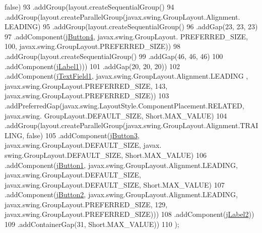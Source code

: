 \begin{DoxyCode}
{      false})
93                             .addGroup(layout.createSequentialGroup()
94                                 .addGroup(layout.createParallelGroup(javax.swing.GroupLayout.Alignment.
      LEADING)
95                                     .addGroup(layout.createSequentialGroup()
96                                         .addGap(23, 23, 23)
97                                         .addComponent(\mbox{\hyperlink{classpecl6part2_1_1_modulo_controlador_a0fd427b07850c91ef7c49d42321b6ec4}{jButton4}}, javax.swing.GroupLayout.
      PREFERRED\_SIZE, 100, javax.swing.GroupLayout.PREFERRED\_SIZE))
98                                     .addGroup(layout.createSequentialGroup()
99                                         .addGap(46, 46, 46)
100                                         .addComponent(\mbox{\hyperlink{classpecl6part2_1_1_modulo_controlador_a8f34e28c463eece3072679131fe0c448}{jLabel1}})))
101                                 .addGap(20, 20, 20))
102                             .addComponent(\mbox{\hyperlink{classpecl6part2_1_1_modulo_controlador_a7a8c12d92360f65dd601091c44ef20d9}{jTextField1}}, javax.swing.GroupLayout.Alignment.LEADING
      , javax.swing.GroupLayout.PREFERRED\_SIZE, 143, javax.swing.GroupLayout.PREFERRED\_SIZE))
103                         .addPreferredGap(javax.swing.LayoutStyle.ComponentPlacement.RELATED, javax.swing.
      GroupLayout.DEFAULT\_SIZE, Short.MAX\_VALUE)
104                         .addGroup(layout.createParallelGroup(javax.swing.GroupLayout.Alignment.TRAILING, \textcolor{keyword}{
      false})
105                             .addComponent(\mbox{\hyperlink{classpecl6part2_1_1_modulo_controlador_a0e4337a4107a44ac33ceb447ee056f59}{jButton3}}, javax.swing.GroupLayout.DEFAULT\_SIZE, javax.
      swing.GroupLayout.DEFAULT\_SIZE, Short.MAX\_VALUE)
106                             .addComponent(\mbox{\hyperlink{classpecl6part2_1_1_modulo_controlador_acdf6c079fea2dc2a66c8b0e5f4ec10e3}{jButton1}}, javax.swing.GroupLayout.Alignment.LEADING, 
      javax.swing.GroupLayout.DEFAULT\_SIZE, javax.swing.GroupLayout.DEFAULT\_SIZE, Short.MAX\_VALUE)
107                             .addComponent(\mbox{\hyperlink{classpecl6part2_1_1_modulo_controlador_a38f1d50c40672c81a4ec1fa0a5fa1ca9}{jButton2}}, javax.swing.GroupLayout.Alignment.LEADING, 
      javax.swing.GroupLayout.PREFERRED\_SIZE, 129, javax.swing.GroupLayout.PREFERRED\_SIZE)))
108                     .addComponent(\mbox{\hyperlink{classpecl6part2_1_1_modulo_controlador_a322924ffd4409beca92e1f9ef6d108e5}{jLabel2}}))
109                 .addContainerGap(31, Short.MAX\_VALUE))
110         );

\end{DoxyCode}
